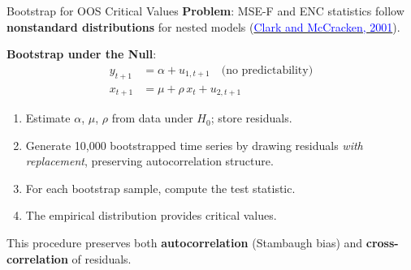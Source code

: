 \documentclass{beamer}
\begin{document}
\begin{frame}{Bootstrap for OOS Critical Values}
    \textbf{Problem}: MSE-F and ENC statistics follow \textbf{nonstandard distributions} for nested models (\href{https://doi.org/10.1016/S0304-4076(01)00071-9}{\textcolor{blue}{Clark and McCracken, 2001}}).

    \vspace{0.3cm}
    \textbf{Bootstrap under the Null}:
    \begin{align}
        y_{t+1} &= \alpha + u_{1,t+1} \quad \text{(no predictability)} \\
        x_{t+1} &= \mu + \rho \, x_t + u_{2,t+1}
    \end{align}
    \begin{enumerate}
        \item Estimate $\alpha$, $\mu$, $\rho$ from data under $H_0$; store residuals.
        \item Generate 10,000 bootstrapped time series by drawing residuals \textit{with replacement}, preserving autocorrelation structure.
        \item For each bootstrap sample, compute the test statistic.
        \item The empirical distribution provides critical values.
    \end{enumerate}

    \vspace{0.2cm}
    This procedure preserves both \textbf{autocorrelation} (Stambaugh bias) and \textbf{cross-correlation} of residuals.
\end{frame}
\end{document}
